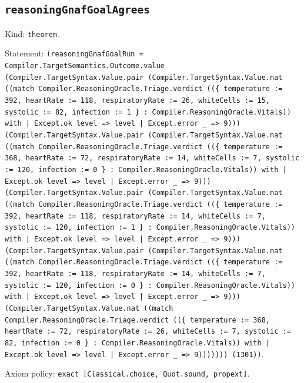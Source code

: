 \documentclass[11pt]{article}
\begin{document}
\subsection*{\texttt{reasoningGnafGoalAgrees}}
\noindent Kind: \texttt{theorem}.\par
\noindent Statement: \texttt{(reasoningGnafGoalRun = Compiler.TargetSemantics.Outcome.value (Compiler.TargetSyntax.Value.pair (Compiler.TargetSyntax.Value.nat ((match Compiler.ReasoningOracle.Triage.verdict ((\{ temperature := 392, heartRate := 118, respiratoryRate := 26, whiteCells := 15, systolic := 82, infection := 1 \} : Compiler.ReasoningOracle.Vitals)) with | Except.ok level => level | Except.error \_ => 9))) (Compiler.TargetSyntax.Value.pair (Compiler.TargetSyntax.Value.nat ((match Compiler.ReasoningOracle.Triage.verdict ((\{ temperature := 368, heartRate := 72, respiratoryRate := 14, whiteCells := 7, systolic := 120, infection := 0 \} : Compiler.ReasoningOracle.Vitals)) with | Except.ok level => level | Except.error \_ => 9))) (Compiler.TargetSyntax.Value.pair (Compiler.TargetSyntax.Value.nat ((match Compiler.ReasoningOracle.Triage.verdict ((\{ temperature := 392, heartRate := 118, respiratoryRate := 14, whiteCells := 7, systolic := 120, infection := 1 \} : Compiler.ReasoningOracle.Vitals)) with | Except.ok level => level | Except.error \_ => 9))) (Compiler.TargetSyntax.Value.pair (Compiler.TargetSyntax.Value.nat ((match Compiler.ReasoningOracle.Triage.verdict ((\{ temperature := 392, heartRate := 118, respiratoryRate := 14, whiteCells := 7, systolic := 120, infection := 0 \} : Compiler.ReasoningOracle.Vitals)) with | Except.ok level => level | Except.error \_ => 9))) (Compiler.TargetSyntax.Value.nat ((match Compiler.ReasoningOracle.Triage.verdict ((\{ temperature := 368, heartRate := 72, respiratoryRate := 26, whiteCells := 7, systolic := 82, infection := 0 \} : Compiler.ReasoningOracle.Vitals)) with | Except.ok level => level | Except.error \_ => 9))))))) (1301))}.\par
\noindent Axiom policy: \texttt{exact [Classical.choice, Quot.sound, propext]}.\par
\end{document}

